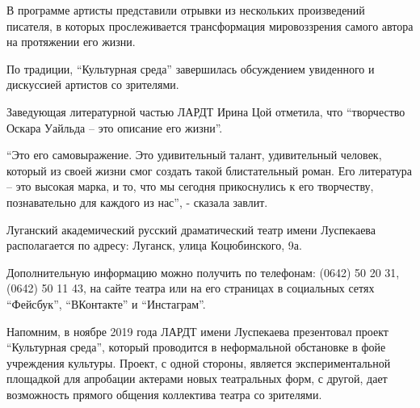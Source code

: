 
В программе артисты представили отрывки из нескольких произведений писателя, в
которых прослеживается трансформация мировоззрения самого автора на протяжении
его жизни.

По традиции, \enquote{Культурная среда} завершилась обсуждением увиденного и дискуссией
артистов со зрителями.

Заведующая литературной частью ЛАРДТ Ирина Цой отметила, что \enquote{творчество Оскара
Уайльда – это описание его жизни}.


\enquote{Это его самовыражение. Это удивительный талант, удивительный человек, который
из своей жизни смог создать такой блистательный роман. Его литература – это
высокая марка, и то, что мы сегодня прикоснулись к его творчеству,
познавательно для каждого из нас}, - сказала завлит.

Луганский академический русский драматический театр имени Луспекаева
располагается по адресу: Луганск, улица Коцюбинского, 9а.

Дополнительную информацию можно получить по телефонам: (0642) 50 20 31, (0642)
50 11 43, на сайте театра или на его страницах в социальных сетях \enquote{Фейсбук},
\enquote{ВКонтакте} и \enquote{Инстаграм}.

Напомним, в ноябре 2019 года ЛАРДТ имени Луспекаева презентовал проект
\enquote{Культурная среда}, который проводится в неформальной обстановке в фойе
учреждения культуры. Проект, с одной стороны, является экспериментальной
площадкой для апробации актерами новых театральных форм, с другой, дает
возможность прямого общения коллектива театра со зрителями.
